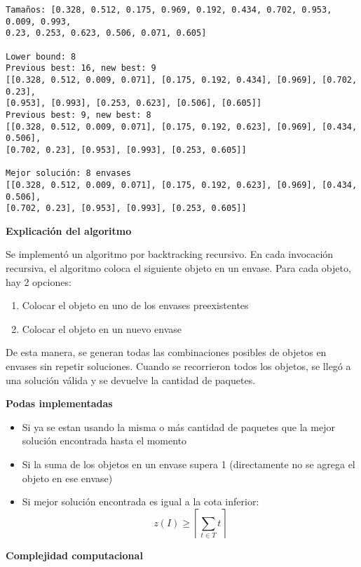 \documentclass[11pt]{article}
\providecommand{\tightlist}{%
      \setlength{\itemsep}{0pt}\setlength{\parskip}{0pt}}
\begin{document}
    \begin{Verbatim}[commandchars=\\\{\}]
Tamaños: [0.328, 0.512, 0.175, 0.969, 0.192, 0.434, 0.702, 0.953, 0.009, 0.993,
0.23, 0.253, 0.623, 0.506, 0.071, 0.605]

Lower bound: 8
Previous best: 16, new best: 9
[[0.328, 0.512, 0.009, 0.071], [0.175, 0.192, 0.434], [0.969], [0.702, 0.23],
[0.953], [0.993], [0.253, 0.623], [0.506], [0.605]]
Previous best: 9, new best: 8
[[0.328, 0.512, 0.009, 0.071], [0.175, 0.192, 0.623], [0.969], [0.434, 0.506],
[0.702, 0.23], [0.953], [0.993], [0.253, 0.605]]

Mejor solución: 8 envases
[[0.328, 0.512, 0.009, 0.071], [0.175, 0.192, 0.623], [0.969], [0.434, 0.506],
[0.702, 0.23], [0.953], [0.993], [0.253, 0.605]]
    \end{Verbatim}

    \textbf{Explicación del algoritmo}

Se implementó un algoritmo por backtracking recursivo. En cada
invocación recursiva, el algoritmo coloca el siguiente objeto en un
envase. Para cada objeto, hay 2 opciones:

\begin{enumerate}
\def\labelenumi{\arabic{enumi}.}
\tightlist
\item
  Colocar el objeto en uno de los envases preexistentes
\item
  Colocar el objeto en un nuevo envase
\end{enumerate}

De esta manera, se generan todas las combinaciones posibles de objetos
en envases sin repetir soluciones. Cuando se recorrieron todos los
objetos, se llegó a una solución válida y se devuelve la cantidad de
paquetes.

\textbf{Podas implementadas}

\begin{itemize}
\tightlist
\item
  Si ya se estan usando la misma o más cantidad de paquetes que la mejor
  solución encontrada hasta el momento
\item
  Si la suma de los objetos en un envase supera 1 (directamente no se
  agrega el objeto en ese envase)
\item
  Si mejor solución encontrada es igual a la cota inferior:
  \[ z(I) \geq \left\lceil \sum\limits_{t \in T} t \right\rceil \]
\end{itemize}

\textbf{Complejidad computacional}
\end{document}
